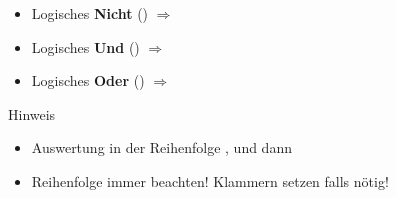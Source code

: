 
\begin{frame}
    \slidehead
    \begin{itemize}
        \item Logisches \textbf{Nicht} (\kotlininline{!})  $\Rightarrow$ 
        \item Logisches \textbf{Und} (\kotlininline{&&}) $\Rightarrow$ 
        \item Logisches \textbf{Oder} (\kotlininline{||})  $\Rightarrow$ 
    \end{itemize}
    \begin{block}{Hinweis}
        \begin{itemize}
            \item Auswertung in der Reihenfolge \kotlininline{!}, \kotlininline{&&} und dann \kotlininline{||}
            \item Reihenfolge immer beachten!
                Klammern setzen falls nötig!
        \end{itemize}
    \end{block}
\end{frame}

\livecoding

